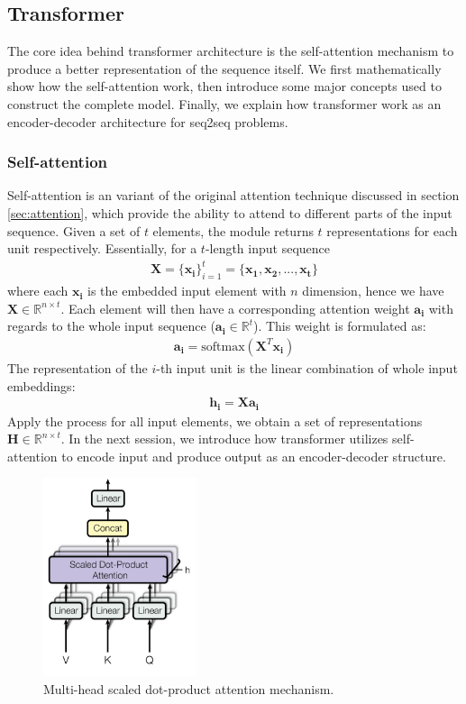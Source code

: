 \subsection{Transformer}
\label{sec:transformer}
The core idea behind transformer architecture is the self-attention mechanism to produce a better representation of the sequence itself. 
We first mathematically show how the self-attention work, then introduce some major concepts used to construct the complete model. 
Finally, we explain how transformer work as an encoder-decoder architecture for seq2seq problems. 
\subsubsection{Self-attention}
\label{sec:self_attn}
Self-attention is an variant of the original attention technique discussed in section \ref{sec:attention}, which provide the ability to attend to different parts of the input sequence. Given a set of $t$ elements, the module returns $t$ representations for each unit respectively.
Essentially, for a $t$-length input sequence
\begin{align*}
    \mathbf{X} = \{{\mathbf{x_i}}\}_{i=1}^t = \{\mathbf{x_1}, \mathbf{x_2}, ..., \mathbf{x_t}\}
\end{align*}
where each $\mathbf{x_i}$ is the embedded input element with $n$ dimension, hence we have $\mathbf{X} \in \mathbb{R}^{n \times t}$.
Each element will then have a corresponding attention weight $\mathbf{a_i}$ with regards to the whole input sequence ($\mathbf{a_i} \in \mathbb{R}^t$). This weight is formulated as:
\begin{align}
    \label{eqn:self_attn_alpha}
    \mathbf{a_i} = \mathrm{softmax}(\mathbf{X}^T\mathbf{x_i})
\end{align}
The representation of the $i$-th input unit is the linear combination of whole input embeddings:
\begin{align}
    \mathbf{h_i} =  \mathbf{X}\mathbf{a_i}
\end{align}
Apply the process for all input elements, we obtain a set of representations $\mathbf{H} \in \mathbb{R}^{n \times t}$. In the next session, we introduce how transformer utilizes self-attention to encode input and produce output as an encoder-decoder structure.
\begin{figure}[t!]
    \centering
    \includegraphics[width=0.4\textwidth]{resources/images/Transformer_multi-head.png}
    \caption{Multi-head scaled dot-product attention mechanism.\cite{vaswani2017attention}}
    \label{fig:trans_multi-head}
\end{figure}
